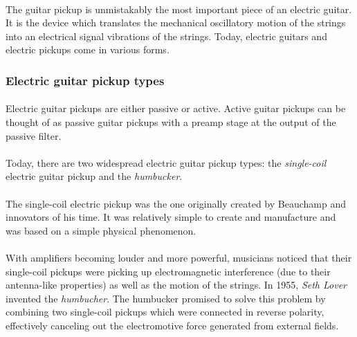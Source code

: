 \documentclass{article}
\begin{document}
\paragraph*{}
The guitar pickup is unmistakably the most important piece of an electric
guitar. It is the device which translates the mechanical oscillatory motion of
the strings into an electrical signal vibrations of the strings. Today,
electric guitars and electric pickups come in various forms.

\subsubsection{Electric guitar pickup types}

\paragraph*{}
Electric guitar pickups are either passive or active. Active guitar pickups can
be thought of as passive guitar pickups with a preamp stage at the output of
the passive filter.

\paragraph*{}
Today, there are two widespread electric guitar pickup types: the
\textit{single-coil} electric guitar pickup and the \textit{humbucker}.

\paragraph*{}
The single-coil electric pickup was the one originally created by Beauchamp and
innovators of his time. It was relatively simple to create and manufacture and
was based on a simple physical phenomenon.

\paragraph*{}
With amplifiers becoming louder and more powerful, musicians noticed that their
single-coil pickups were picking up electromagnetic interference (due to their
antenna-like properties) as well as the motion of the strings. In 1955,
\textit{Seth Lover} invented the \textit{humbucher}. The humbucker promised to
solve this problem by combining two single-coil pickups which were connected in
reverse polarity, effectively canceling out the electromotive force generated
from external fields.
\end{document}
